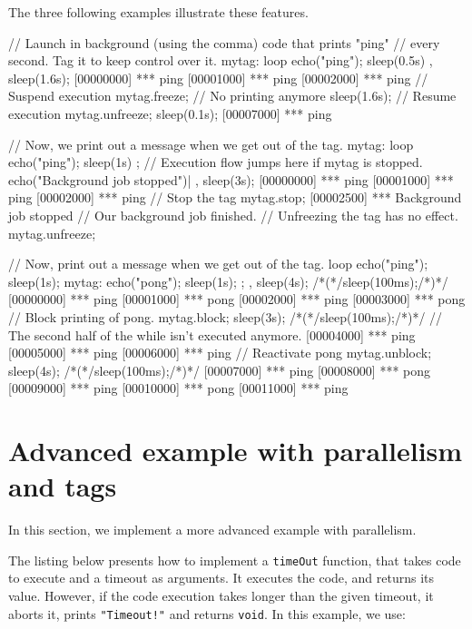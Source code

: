 The three following examples illustrate these features.

\begin{urbiscript}
// Launch in background (using the comma) code that prints "ping"
// every second.  Tag it to keep control over it.
mytag:
{
  loop
  {
    echo("ping");
    sleep(0.5s)
  }
},
sleep(1.6s);
[00000000] *** ping
[00001000] *** ping
[00002000] *** ping
// Suspend execution
mytag.freeze;
// No printing anymore
sleep(1.6s);
// Resume execution
mytag.unfreeze;
sleep(0.1s);
[00007000] *** ping
\end{urbiscript}

\begin{urbiscript}
// Now, we print out a message when we get out of the tag.
{
  mytag:
  {
    loop
    {
      echo("ping"); sleep(1s)
    }
  };
  // Execution flow jumps here if mytag is stopped.
  echo("Background job stopped")|
},
sleep(3s);
[00000000] *** ping
[00001000] *** ping
[00002000] *** ping
// Stop the tag
mytag.stop;
[00002500] *** Background job stopped
// Our background job finished.
// Unfreezing the tag has no effect.
mytag.unfreeze;
\end{urbiscript}

\begin{urbiscript}
// Now, print out a message when we get out of the tag.
loop
{
  echo("ping"); sleep(1s);
  mytag: { echo("pong"); sleep(1s); };
},
sleep(4s);
/*(*/sleep(100ms);/*)*/
[00000000] *** ping
[00001000] *** pong
[00002000] *** ping
[00003000] *** pong
// Block printing of pong.
mytag.block;
sleep(3s);
/*(*/sleep(100ms);/*)*/
// The second half of the while isn't executed anymore.
[00004000] *** ping
[00005000] *** ping
[00006000] *** ping
// Reactivate pong
mytag.unblock;
sleep(4s);
/*(*/sleep(100ms);/*)*/
[00007000] *** ping
[00008000] *** pong
[00009000] *** ping
[00010000] *** pong
[00011000] *** ping
\end{urbiscript}

\section{Advanced example with parallelism and tags}

In this section, we implement a more advanced example with
parallelism.

The listing below presents how to implement a \lstinline{timeOut}
function, that takes code to execute and a timeout as arguments. It
executes the code, and returns its value. However, if the code
execution takes longer than the given timeout, it aborts it, prints
\lstinline|"Timeout!"| and returns \lstinline|void|. In this example, we use:

